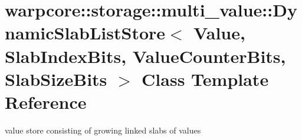 \hypertarget{classwarpcore_1_1storage_1_1multi__value_1_1DynamicSlabListStore}{}\section{warpcore\+:\+:storage\+:\+:multi\+\_\+value\+:\+:Dynamic\+Slab\+List\+Store$<$ Value, Slab\+Index\+Bits, Value\+Counter\+Bits, Slab\+Size\+Bits $>$ Class Template Reference}
\label{classwarpcore_1_1storage_1_1multi__value_1_1DynamicSlabListStore}


value store consisting of growing linked slabs of values  


